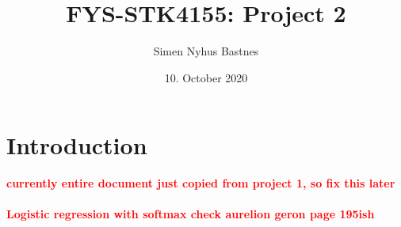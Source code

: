 \documentclass[a4paper]{article}
\title{FYS-STK4155: Project 2}
\author{Simen Nyhus Bastnes}
\date{10. October 2020}
\newcommand\red[1]{\textcolor{red}{\textbf{#1}}}
\begin{document}
\maketitle
\begin{abstract}

\end{abstract}
\section{Introduction}
\red{currently entire document just copied from project 1, so fix this later}
\\\\
\red{Logistic regression with softmax check aurelion geron page 195ish}
\end{document}
